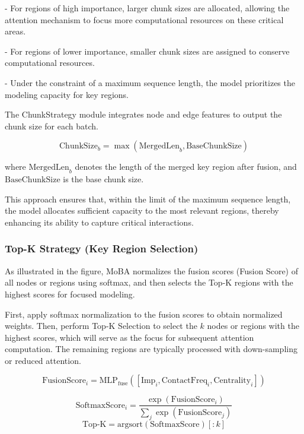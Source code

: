 \documentclass[11pt,a4paper]{article}
\begin{document}
- For regions of high importance, larger chunk sizes are allocated,
  allowing the attention mechanism to focus more computational resources
  on these critical areas.
  
- For regions of lower importance, smaller chunk sizes are assigned to
  conserve computational resources.
  
- Under the constraint of a maximum sequence length, the model
  prioritizes the modeling capacity for key regions.

The ChunkStrategy module integrates node and edge features to output
  the chunk size for each batch.

\begin{equation}
\text{ChunkSize}_b = \max(\text{MergedLen}_b, \text{BaseChunkSize})
\end{equation}

where $\text{MergedLen}_b$ denotes the length of the merged key region
after fusion, and $\text{BaseChunkSize}$ is the base chunk size.

This approach ensures that, within the limit of the maximum sequence
length, the model allocates sufficient capacity to the most relevant
regions, thereby enhancing its ability to capture critical interactions.


\subsubsection{Top-K Strategy (Key Region Selection)}
As illustrated in the figure, MoBA normalizes the fusion scores (Fusion
Score) of all nodes or regions using softmax, and then selects the Top-K
regions with the highest scores for focused modeling.

First, apply softmax normalization to the fusion scores to
 obtain normalized weights.
Then, perform Top-K Selection to select the $k$ nodes or regions with
 the highest scores, which will serve as the focus for
 subsequent attention computation.
The remaining regions are typically processed with down-sampling or
 reduced attention.

\begin{equation}
\text{FusionScore}_i = \text{MLP}_{\text{fuse}}\left(\left[ \text{Imp}_i, \text{ContactFreq}_i, \text{Centrality}_i \right]\right)
\end{equation}

\begin{equation}
\text{SoftmaxScore}_i = \frac{\exp(\text{FusionScore}_i)}{\sum_j \exp(\text{FusionScore}_j)}
\end{equation}
\begin{equation}
\text{Top-K} = \text{argsort}(\text{SoftmaxScore})[:k]
\end{equation}
\end{document}
